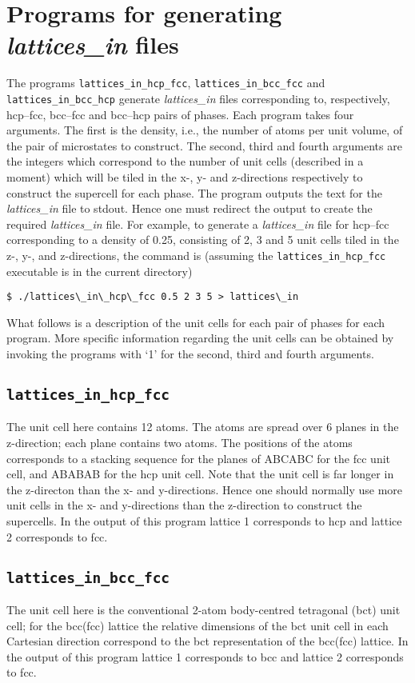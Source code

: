\documentclass{report}
\begin{document}
\section{Programs for generating \emph{lattices\_in} files}
The programs \texttt{lattices\_in\_hcp\_fcc}, \texttt{lattices\_in\_bcc\_fcc} and \texttt{lattices\_in\_bcc\_hcp} generate \emph{lattices\_in} 
files corresponding to, respectively, hcp--fcc, bcc--fcc and bcc--hcp pairs of phases.
Each program takes four arguments. The first is the density, i.e., the number of atoms per unit volume, of the pair of microstates to
construct. The second, third and fourth arguments are the integers which correspond
to the number of unit cells (described in a moment) which will be tiled in the x-, y- and z-directions respectively to construct the
supercell for each phase. The program outputs the text for the \emph{lattices\_in} file to stdout. Hence one must redirect the output
to create the required \emph{lattices\_in} file.
For example, to generate a \emph{lattices\_in} file for hcp--fcc corresponding to a density of 0.25, consisting
of 2, 3 and 5 unit cells tiled in the z-, y-, and z-directions, the command is (assuming the \texttt{lattices\_in\_hcp\_fcc} executable
is in the current directory)
\begin{verbatim}
$ ./lattices\_in\_hcp\_fcc 0.5 2 3 5 > lattices\_in
\end{verbatim}

What follows is a description of the unit cells for each pair of phases for each program. More specific information regarding the unit
cells can be obtained by invoking the programs with `1' for the second, third and fourth arguments. 

\subsection{\texttt{lattices\_in\_hcp\_fcc}}
The unit cell here contains 12 atoms. The atoms are spread over 6 planes in the z-direction; each plane contains two atoms. The positions
of the atoms corresponds to a stacking sequence for the planes of ABCABC for the fcc unit cell, and  ABABAB for the hcp unit cell. 
Note that the unit cell is far longer in the z-directon than the x- and y-directions. Hence one should normally use more unit cells in 
the x- and y-directions than the z-direction to construct the supercells. In the output of this program lattice 1 corresponds to hcp and
lattice 2 corresponds to fcc.

\subsection{\texttt{lattices\_in\_bcc\_fcc}}
The unit cell here is the conventional 2-atom body-centred tetragonal (bct) unit cell; for the bcc(fcc) lattice the relative dimensions of 
the bct unit cell in each Cartesian direction correspond to the bct representation of the bcc(fcc) lattice. In the output of this program
lattice 1 corresponds to bcc and lattice 2 corresponds to fcc.
\end{document}
